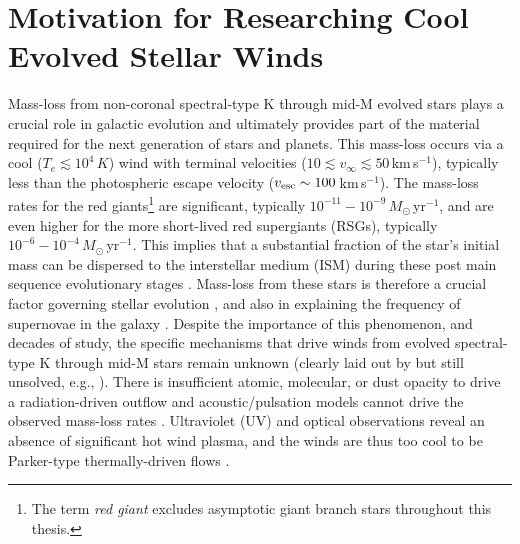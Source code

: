 \section{Motivation for Researching Cool Evolved Stellar Winds}\label{sec:1.1}
Mass-loss from non-coronal spectral-type K through mid-M evolved stars plays a crucial role in galactic evolution and ultimately provides part of the material required for the next generation of stars and planets. This mass-loss occurs via a cool ($T_{e} \lesssim 10^4\,K$) wind with terminal velocities ($10 \lesssim v_{\infty} \lesssim 50$\,km\,s$^{-1}$), typically less than the photospheric escape velocity ($v_{\rm{esc}} \sim 100$\,km\,s$^{-1}$). The mass-loss rates for the red giants\footnote{The term \textit{red giant} excludes asymptotic giant branch stars throughout this thesis.} are significant, typically $10^{-11}-10^{-9}$\,$M_{\odot}$\,yr$^{-1}$, and are even higher for the more short-lived red supergiants (RSGs), typically $10^{-6}-10^{-4}$\,$M_{\odot}$\,yr$^{-1}$. This implies that a substantial fraction of the star's initial mass can be dispersed to the interstellar medium (ISM) during these post main sequence evolutionary stages \citep[e.g.,][]{schroder_2001}. Mass-loss from these stars is therefore a crucial factor governing stellar evolution \citep{chiosi_1986}, and also in explaining the frequency of supernovae in the galaxy \citep{van_loon_2010,dohm-palmer_2002}. Despite the importance of this phenomenon, and decades of study, the specific mechanisms that drive winds from evolved spectral-type K through mid-M stars remain unknown (clearly laid out by \citealt{holzer_1985} but still unsolved, e.g., \citealt{crowley_2009}). There is insufficient atomic, molecular, or dust opacity to drive a radiation-driven outflow \citep{zukerman_1995,jones_2008} and acoustic/pulsation models cannot drive the observed mass-loss rates \citep{sutmann_1995}. Ultraviolet (UV) and optical observations reveal an absence of significant hot wind plasma, and the winds are thus too cool to be Parker-type thermally-driven flows \cite[e.g.,][]{linsky_1979,haisch_1980,ayres_1981}. 

